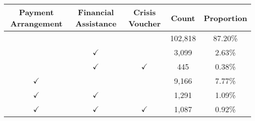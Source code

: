 \begin{tabular}{c|c|c|c|c}
\toprule 
\midrule 
Payment Arrangement & Financial Assistance & Crisis Voucher & Count & Proportion \\
\midrule 
 &  &  & 102,818 & 87.20\% \\
 & $\checkmark$ &  & 3,099 & 2.63\% \\
 & $\checkmark$ & $\checkmark$ & 445 & 0.38\% \\
$\checkmark$ &  &  & 9,166 & 7.77\% \\
$\checkmark$ & $\checkmark$ &  & 1,291 & 1.09\% \\
$\checkmark$ & $\checkmark$ & $\checkmark$ & 1,087 & 0.92\% \\
\midrule 
\bottomrule 
\end{tabular}
